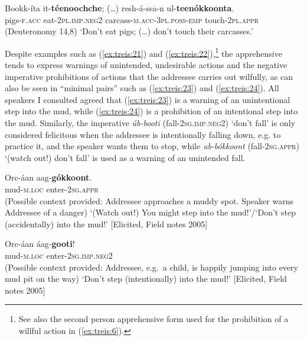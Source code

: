 \documentclass[output=paper,colorlinks,citecolor=brown,
]{langsci/langscibook}
\begin{document}
\ea\label{ex:treis:22}
\gll Bookk-íta 	it-\textbf{téenoochche}; \textnormal{(\ldots)} 	resh-á-ssa-n 						ul-\textbf{teenókkoonta}. \\
pigs-\textsc{f.acc}	eat-\textsc{2pl.imp.neg2} {} carcass-\textsc{m.acc-3pl.poss-emp}	touch-\textsc{2pl.appr}\\
\glt (Deuteronomy 14,8) `Don't eat pigs; (\ldots) don't touch their carcasses.'   \citep{KHTPHNodate}
\z 

Despite examples such as (\ref{ex:treis:21}) and (\ref{ex:treis:22}),\footnote{See also the second person apprehensive form used for the prohibition of a willful action in (\ref{ex:treis:6}).} the apprehensive tends to express warnings of unintended, undesirable actions and the negative imperative prohibitions of actions that the addressee carries out wilfully, as can also be seen in ``minimal pairs'' such as (\ref{ex:treis:23}) and (\ref{ex:treis:24}). All speakers I consulted agreed that (\ref{ex:treis:23}) is a warning of an unintentional step into the mud, while (\ref{ex:treis:24}) is a prohibition of an intentional step into the mud. Similarly, the imperative \textit{úb-booti} (fall-\textsc{2sg.imp.neg2}) `don't fall' is only considered felicitous when the addressee is intentionally falling down, e.g. to practice it, and the speaker wants them to stop, while \textit{ub-bókkoont} (fall-\textsc{2sg.appr}) `(watch out!) don't fall' is used as a warning of an unintended fall.

\ea\label{ex:treis:23}
\gll Orc-áan aag-\textbf{gókkoont}. \\
mud-\textsc{m.loc} enter-\textsc{2sg.appr}\\
\glt (Possible context provided: Addressee approaches a muddy spot. Speaker warns Addressee of a danger) `(Watch out!) You might step into the mud!'\slash `Don't step (accidentally) into the mud!'  [Elicited, Field notes 2005]
\z 

\ea\label{ex:treis:24} 
\gll Orc-áan áag-\textbf{gooti}!\\
mud-\textsc{m.loc} enter-\textsc{2sg.imp.neg2}\\
\glt (Possible context provided: Addressee,  e.g.\ a child, is happily jumping into every mud pit on the way) `Don't step (intentionally) into the mud!'  [Elicited, Field notes 2005]
\z 
\end{document}
